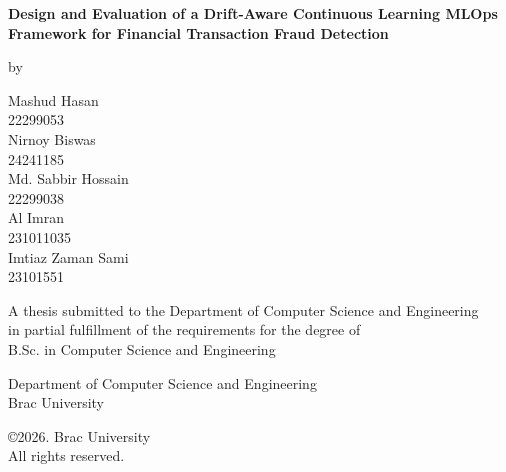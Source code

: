 \documentclass[12pt,a4paper]{report}
\begin{document}
\begin{titlepage}
\centering
{\LARGE\bfseries Design and Evaluation of a Drift-Aware Continuous Learning MLOps Framework for Financial Transaction Fraud Detection\par}
\vspace{1.5em} by\par\vspace{1em}
Mashud Hasan\\ 22299053\\[0.4em]
Nirnoy Biswas\\ 24241185\\[0.4em]
Md. Sabbir Hossain\\ 22299038\\[0.4em]
Al Imran\\ 231011035\\[0.4em]
Imtiaz Zaman Sami\\ 23101551\par
\vfill
A thesis submitted to the Department of Computer Science and Engineering\\ in partial fulfillment of the requirements for the degree of\\ B.Sc. in Computer Science and Engineering\par
\vspace{1.5em}
Department of Computer Science and Engineering\\ Brac University\\ [Month Year]\par
\vfill
\copyright 2026. Brac University\\ All rights reserved.
\end{titlepage}

\end{document}
